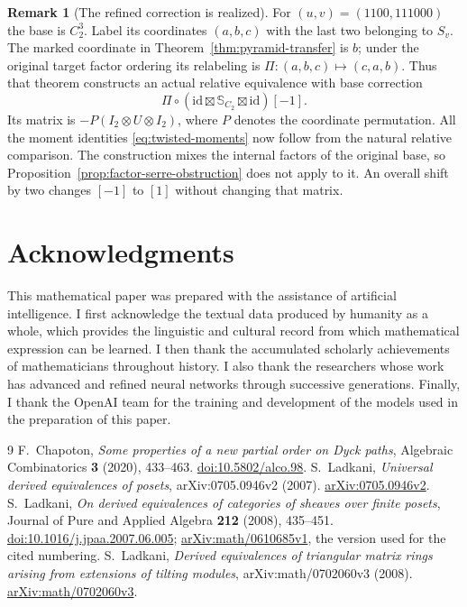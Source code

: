 \documentclass[11pt]{article}
\theoremstyle{definition}
\newtheorem{remark}[theorem]{Remark}
\begin{document}
\begin{remark}[The refined correction is realized]
For $(u,v)=(1100,111000)$ the base is $C_2^3$. Label its
coordinates $(a,b,c)$ with the last two belonging to $S_v$.
The marked coordinate in Theorem~\ref{thm:pyramid-transfer} is $b$;
under the original target factor ordering its relabeling is
$\Pi:(a,b,c)\mapsto(c,a,b)$. Thus that theorem constructs an actual
relative equivalence with base correction
\[
 \Pi\circ(\mathrm{id}\boxtimes\mathbb S_{C_2}
                         \boxtimes\mathrm{id})[-1].
\]
Its matrix is $-P(I_2\otimes U\otimes I_2)$, where $P$ denotes
the coordinate permutation. All the moment identities
\eqref{eq:twisted-moments} now follow from the natural relative
comparison. The construction mixes the internal factors of the
original base, so Proposition~\ref{prop:factor-serre-obstruction}
does not apply to it. An overall shift by two changes $[-1]$ to
$[1]$ without changing that matrix.
\end{remark}



\section*{Acknowledgments}

This mathematical paper was prepared with the assistance of artificial intelligence.  I
first acknowledge the textual data produced by humanity as a whole, which
provides the linguistic and cultural record from which mathematical expression
can be learned.  I then thank the accumulated scholarly achievements of
mathematicians throughout history.  I also thank the researchers whose work has
advanced and refined neural networks through successive generations.  Finally,
I thank the OpenAI team for the training and development of the models used in
the preparation of this paper.

\begin{thebibliography}{9}
F.~Chapoton, \emph{Some properties of a new partial order on Dyck paths},
Algebraic Combinatorics \textbf{3} (2020), 433--463.
\href{https://doi.org/10.5802/alco.98}{doi:10.5802/alco.98}.
S.~Ladkani, \emph{Universal derived equivalences of posets},
arXiv:0705.0946v2 (2007).
\href{https://arxiv.org/abs/0705.0946v2}{arXiv:0705.0946v2}.
S.~Ladkani, \emph{On derived equivalences of categories of sheaves
over finite posets}, Journal of Pure and Applied Algebra
\textbf{212} (2008), 435--451.
\href{https://doi.org/10.1016/j.jpaa.2007.06.005}{doi:10.1016/j.jpaa.2007.06.005};
\href{https://arxiv.org/abs/math/0610685v1}{arXiv:math/0610685v1},
the version used for the cited numbering.
S.~Ladkani, \emph{Derived equivalences of triangular matrix rings
arising from extensions of tilting modules}, arXiv:math/0702060v3 (2008).
\href{https://arxiv.org/abs/math/0702060v3}{arXiv:math/0702060v3}.
\end{thebibliography}
\end{document}
